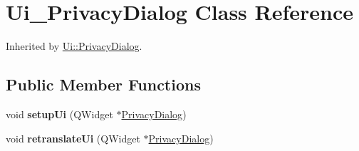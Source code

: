 \hypertarget{class_ui___privacy_dialog}{}\section{Ui\+\_\+\+Privacy\+Dialog Class Reference}
\label{class_ui___privacy_dialog}


Inherited by \mbox{\hyperlink{class_ui_1_1_privacy_dialog}{Ui\+::\+Privacy\+Dialog}}.

\subsection*{Public Member Functions}
\begin{DoxyCompactItemize}
\item 
\mbox{\label{class_ui___privacy_dialog_a0a9fd76688e94e449b0c1637ea16cdf7}} 
void {\bfseries setup\+Ui} (Q\+Widget $\ast$\mbox{\hyperlink{class_privacy_dialog}{Privacy\+Dialog}})
\item 
\mbox{\label{class_ui___privacy_dialog_a8ec23c1fc9e3352da2e15ba110eb930a}} 
void {\bfseries retranslate\+Ui} (Q\+Widget $\ast$\mbox{\hyperlink{class_privacy_dialog}{Privacy\+Dialog}})
\end{DoxyCompactItemize}
